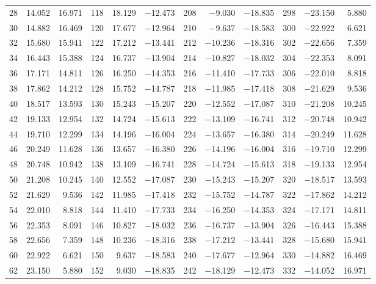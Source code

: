 \begin{table}[!h]
{\begin{tabular}{rrr|rrr|rrr|rrr}
 28 &  14.052 & 16.971 & 118 &  18.129 & $-$12.473 & 208 &  $-$9.030 & $-$18.835 & 298 & $-$23.150 &  5.880\\
 30 &  14.882 & 16.469 & 120 &  17.677 & $-$12.964 & 210 &  $-$9.637 & $-$18.583 & 300 & $-$22.922 &  6.621\\
 32 &  15.680 & 15.941 & 122 &  17.212 & $-$13.441 & 212 & $-$10.236 & $-$18.316 & 302 & $-$22.656 &  7.359\\
 34 &  16.443 & 15.388 & 124 &  16.737 & $-$13.904 & 214 & $-$10.827 & $-$18.032 & 304 & $-$22.353 &  8.091\\
 36 &  17.171 & 14.811 & 126 &  16.250 & $-$14.353 & 216 & $-$11.410 & $-$17.733 & 306 & $-$22.010 &  8.818\\
 38 &  17.862 & 14.212 & 128 &  15.752 & $-$14.787 & 218 & $-$11.985 & $-$17.418 & 308 & $-$21.629 &  9.536\\
 40 &  18.517 & 13.593 & 130 &  15.243 & $-$15.207 & 220 & $-$12.552 & $-$17.087 & 310 & $-$21.208 & 10.245\\
 42 &  19.133 & 12.954 & 132 &  14.724 & $-$15.613 & 222 & $-$13.109 & $-$16.741 & 312 & $-$20.748 & 10.942\\
 44 &  19.710 & 12.299 & 134 &  14.196 & $-$16.004 & 224 & $-$13.657 & $-$16.380 & 314 & $-$20.249 & 11.628\\
 46 &  20.249 & 11.628 & 136 &  13.657 & $-$16.380 & 226 & $-$14.196 & $-$16.004 & 316 & $-$19.710 & 12.299\\
 48 &  20.748 & 10.942 & 138 &  13.109 & $-$16.741 & 228 & $-$14.724 & $-$15.613 & 318 & $-$19.133 & 12.954\\
 50 &  21.208 & 10.245 & 140 &  12.552 & $-$17.087 & 230 & $-$15.243 & $-$15.207 & 320 & $-$18.517 & 13.593\\
 52 &  21.629 &  9.536 & 142 &  11.985 & $-$17.418 & 232 & $-$15.752 & $-$14.787 & 322 & $-$17.862 & 14.212\\
 54 &  22.010 &  8.818 & 144 &  11.410 & $-$17.733 & 234 & $-$16.250 & $-$14.353 & 324 & $-$17.171 & 14.811\\
 56 &  22.353 &  8.091 & 146 &  10.827 & $-$18.032 & 236 & $-$16.737 & $-$13.904 & 326 & $-$16.443 & 15.388\\
 58 &  22.656 &  7.359 & 148 &  10.236 & $-$18.316 & 238 & $-$17.212 & $-$13.441 & 328 & $-$15.680 & 15.941\\
 60 &  22.922 &  6.621 & 150 &   9.637 & $-$18.583 & 240 & $-$17.677 & $-$12.964 & 330 & $-$14.882 & 16.469\\
 62 &  23.150 &  5.880 & 152 &   9.030 & $-$18.835 & 242 & $-$18.129 & $-$12.473 & 332 & $-$14.052 & 16.971\\

\end{tabular}}
\end{table}
